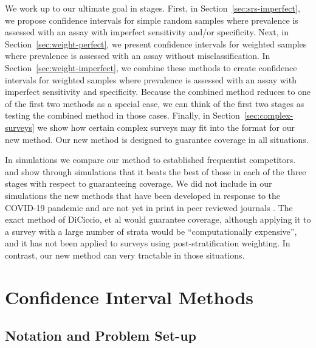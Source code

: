 \documentclass[AMA,STIX1COL]{WileyNJD-v2}
\begin{document}
We work up to our ultimate goal in stages.
First, in Section~\ref{sec:srs-imperfect}, we propose confidence intervals for simple random samples where prevalence is assessed with an assay with imperfect sensitivity and/or specificity.
Next, in Section~\ref{sec:weight-perfect}, we present confidence intervals for weighted samples where prevalence is assessed with an assay without misclassification.
In Section~\ref{sec:weight-imperfect}, we combine these methods to create confidence intervals for weighted samples where prevalence is assessed with an assay with imperfect sensitivity and specificity.
Because the combined method reduces to one of the first two methods as a special case, we can think of the first two stages as testing the combined method in those cases.  Finally, in Section~\ref{sec:complex-surveys} we show how certain complex surveys may fit into the format for our new method.
Our new method is designed to guarantee coverage in all situations. 

In simulations we compare our method to established frequentist competitors.
and  show through simulations that it beats the best of those in each of the three stages with respect to guaranteeing coverage. 
We did not include in our simulations the new methods that have been developed in response to the COVID-19 pandemic and are not yet in print in peer reviewed journals \cite{Cai:2020,DiCi:2021,rosin2021estimating}.
The exact method of DiCiccio, et al \cite{DiCi:2021} would guarantee coverage, although applying it to a survey with a large number of strata would be ``computationally expensive'', and it has not been applied to surveys using post-stratification weighting. In contrast, our new method can very tractable in those situations.   


\section{Confidence Interval Methods}

\subsection{Notation and Problem Set-up}
\label{sec-notation}
\end{document}
